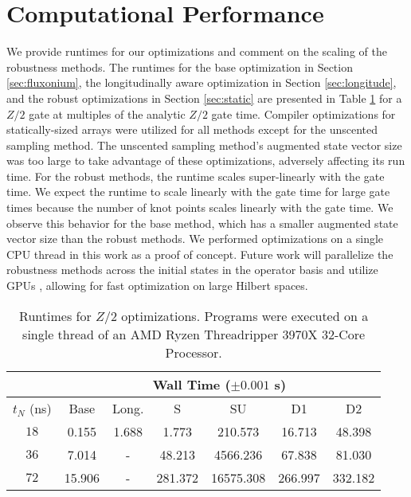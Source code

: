 \section{Computational Performance \label{appendix:time}}
We provide runtimes for our optimizations and comment on the scaling of the
robustness methods. The runtimes for
the base optimization in Section \ref{sec:fluxonium},
the longitudinally aware optimization in Section \ref{sec:longitude},
and the robust optimizations in Section \ref{sec:static}
are presented in Table \ref{tab:time}
for a $Z/2$ gate at multiples of the analytic $Z/2$ gate time.
Compiler optimizations for statically-sized arrays were utilized
for all methods except for the unscented sampling method.
The unscented sampling method's augmented state vector size
was too large to take advantage of these optimizations,
adversely affecting its run time.
For the robust methods, the runtime scales super-linearly with the
gate time. We expect the runtime to scale linearly with the gate time
for large gate times because
the number of knot points scales linearly with the gate time.
We observe this behavior for the base method, which has a smaller
augmented state vector size than the robust methods.
We performed optimizations on a single CPU thread in this work as a proof
of concept. Future work will parallelize the robustness
methods across the initial states in the operator basis and utilize GPUs
\cite{leung2017speedup},
allowing for fast optimization on large Hilbert spaces.
\vspace*{\intextsep}

\begin{table}[H]
  \begin{tabular} {c | c | c | c | c | c | c}
    & \multicolumn{6}{c}{Wall Time ($\pm 0.001$ s)}\\
    \hline
    $t_{N}$ (ns) & Base & Long. & S & SU & D1 & D2\\
    \hline
    $18$ & 0.155 & 1.688 & 1.773 & 210.573 & 16.713 & 48.398\\ %
    $36$ & 7.014 & - & 48.213 & 4566.236 & 67.838 & 81.030\\
    $72$ & 15.906 & - & 281.372 & 16575.308 & 266.997 & 332.182\\
  \end{tabular}
  \caption{
    Runtimes for $Z/2$ optimizations.
    Programs were executed on a single thread of an
    AMD Ryzen Threadripper 3970X 32-Core Processor.
  }
  \label{tab:time}
\end{table}

